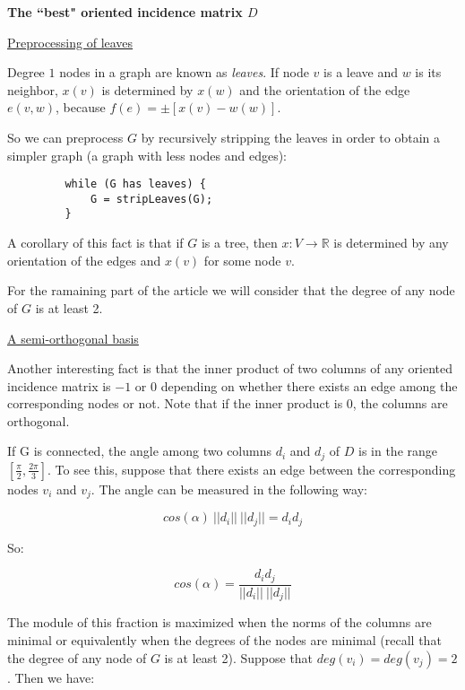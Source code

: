 \documentclass[a4paper,11pt]{article}
\begin{document}
\bigskip

\textbf{The ``best" oriented incidence matrix $D$}

\bigskip

\underline{Preprocessing of leaves}

\bigskip

Degree $1$ nodes in a graph are known as \textit{leaves}. If node $v$ 
is a leave and $w$ is its neighbor, $x(v)$ is determined by $x(w)$ and 
the orientation of the edge $e(v,w)$, because $f(e) = \pm[x(v) - w(w)]$.

\bigskip

So we can preprocess $G$ by recursively stripping the leaves in order 
to obtain a simpler graph (a graph with less nodes and edges):

\bigskip

\begin{verbatim}
         while (G has leaves) {
             G = stripLeaves(G);
         }
\end{verbatim}

A corollary of this fact is that if $G$ is a tree, then $x: V 
\rightarrow \mathbb{R}$ is determined by any orientation of the edges 
and $x(v)$ for some node $v$.

\bigskip

For the ramaining part of the article we will consider that the degree 
of any node of $G$ is at least 2.

\bigskip

\underline{A semi-orthogonal basis}

\bigskip

Another interesting fact is that the inner product of two columns of any 
oriented incidence matrix is $-1$ or $0$ depending on whether there exists an 
edge among the corresponding nodes or not. Note that if the inner 
product is $0$, the columns are orthogonal.

\bigskip

If G is connected, the angle among two columns $d_i$ and $d_j$ of $D$ is 
in the range $[\frac{\pi}{2},\frac{2\pi}{3}]$. To see this, suppose that there exists 
an edge between the corresponding nodes $v_i$ and $v_j$. The angle can be 
measured in the following way:

$$cos(\alpha) \ ||d_i|| \ ||d_j||= d_i  d_j$$

So: 

$$cos(\alpha) = \frac{d_i d_j}{||d_i|| \ ||d_j||}$$

The module of this fraction is maximized when the norms of the columns 
are minimal or equivalently when the degrees of the nodes are minimal 
(recall that the degree of any node of $G$ is at least 2). Suppose that 
$deg(v_i) = deg(v_j) = 2$. Then we have:
\end{document}
